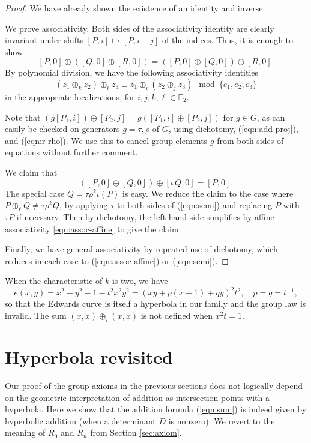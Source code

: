 \documentclass[12pt]{article}
\newcommand{\ring}[1]{\mathbb{#1}}
\begin{document}
\begin{proof} We have already shown the existence of an identity and
  inverse.

  We prove associativity.  Both sides of the associativity identity
  are clearly invariant under shifts $[P,i]\mapsto [P,i+j]$ of the
  indices.  Thus, it is enough to show
\[
[P,0] \oplus ([Q,0]\oplus [R,0]) = ([P,0]\oplus [Q,0])\oplus [R,0].
\]
By polynomial division, we have the following associativity identities
\begin{equation}\label{eqn:assoc-affine}
 (z_1\oplus_k z_2)\oplus_\ell z_3 \equiv z_1 
\oplus_i (z_2\oplus_j z_3) \mod \{e_1,e_2,e_3\}
\end{equation}
in the appropriate localizations, for $i,j,k,\ell\in \ring{F}_2$.

Note that $(g [P_1,i])\oplus [P_2,j] = g([P_1,i]\oplus [P_2,j])$ for
$g\in G$, as can easily be checked on generators $g=\tau,\rho$ of $G$,
using dichotomy, (\ref{eqn:add-proj}), and (\ref{eqn:r-rho}).  We use
this to cancel group elements $g$ from both sides of equations without
further comment.

We claim that
\begin{equation}\label{eqn:semi}
([P,0]\oplus [Q,0])\oplus [\iota\,Q,0] = [P,0].
\end{equation}
The special case $Q= \tau\rho^k \iota(P)$ is easy. We reduce the claim
to the case where $P\oplus_\ell Q\ne \tau\rho^k Q$, by applying $\tau$
to both sides of (\ref{eqn:semi}) and replacing $P$ with $\tau P$ if
necessary.  Then by dichotomy, the left-hand side simplifies by affine
associativity \ref{eqn:assoc-affine} to give the claim.

Finally, we have general associativity by repeated use of dichotomy,
which reduces in each case to (\ref{eqn:assoc-affine}) or
(\ref{eqn:semi}).
\end{proof}

When the characteristic of $k$ is two, we have
\[
e(x,y)= x^2 + y^2 - 1 - t^2 x^2 y^2 
= ( x y + p(x + 1) + q y)^2 t^2,\quad p=q=t^{-1},
\]
so that the Edwards curve is itself a hyperbola in our family and the
group law is invalid.  The sum $(x,x)\oplus_i (x,x)$ is not defined
when $x^2 t=1$.

\section{Hyperbola revisited}

Our proof of the group axioms in the previous sections does not
logically depend on the geometric interpretation of addition as
intersection points with a hyperbola.  Here we show that the addition
formula (\ref{eqn:sum}) is indeed given by hyperbolic addition (when a
determinant $D$ is nonzero).  We revert to the meaning of $R_0$ and
$R_n$ from Section \ref{sec:axiom}.
\end{document}
